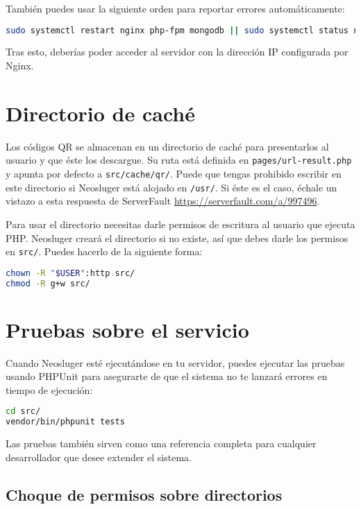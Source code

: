 También puedes usar la siguiente orden para reportar errores automáticamente:

\begin{lstlisting}[language=sh]
sudo systemctl restart nginx php-fpm mongodb || sudo systemctl status nginx
\end{lstlisting}

Tras esto, deberías poder acceder al servidor con la dirección IP configurada por Nginx.

\section{Directorio de caché}\label{directorio-de-cache}

Los códigos QR se almacenan en un directorio de caché para presentarlos al usuario y que éste los descargue.
Su ruta está definida en \texttt{pages/url-result.php} y apunta por defecto a \texttt{src/cache/qr/}.
Puede que tengas prohibido escribir en este directorio si Neosluger está alojado en \texttt{/usr/}.
Si éste es el caso, échale un vistazo a esta respuesta de ServerFault \url{https://serverfault.com/a/997496}.

Para usar el directorio necesitas darle permisos de escritura al usuario que ejecuta PHP.
Neosluger creará el directorio si no existe, así que debes darle los permisos en \texttt{src/}.
Puedes hacerlo de la siguiente forma:

\begin{lstlisting}[language=sh]
chown -R "$USER":http src/
chmod -R g+w src/
\end{lstlisting}

\section{Pruebas sobre el servicio}\label{pruebas-sobre-el-servicio}

Cuando Neosluger esté ejecutándose en tu servidor, puedes ejecutar las pruebas usando PHPUnit para asegurarte de que el sistema no te lanzará errores en tiempo de ejecución:

\begin{lstlisting}[language=sh]
cd src/
vendor/bin/phpunit tests
\end{lstlisting}

Las pruebas también sirven como una referencia completa para cualquier desarrollador que desee extender el sistema.

\subsection{Choque de permisos sobre directorios}

